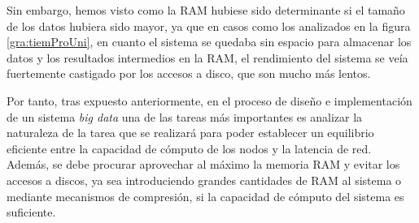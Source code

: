 Sin embargo, hemos visto como la \gls{RAM} hubiese sido determinante si el tamaño de los datos hubiera sido mayor, ya que en casos como los analizados en la figura \ref{gra:tiemProUni}, en cuanto el sistema se quedaba sin espacio para almacenar los datos y los resultados intermedios en la \gls{RAM}, el rendimiento del sistema se veía fuertemente castigado por los accesos a disco, que son mucho más lentos.

Por tanto, tras expuesto anteriormente, en el proceso de diseño e implementación de un sistema \textit{big data} una de las tareas más importantes es analizar la naturaleza de la tarea que se realizará para poder establecer un equilibrio eficiente entre la capacidad de cómputo de los nodos y la latencia de red. Además, se debe procurar aprovechar al máximo la memoria \gls{RAM} y evitar los accesos a discos, ya sea introduciendo grandes cantidades de \gls{RAM} al sistema o mediante mecanismos de compresión, si la capacidad de cómputo del sistema es suficiente.
